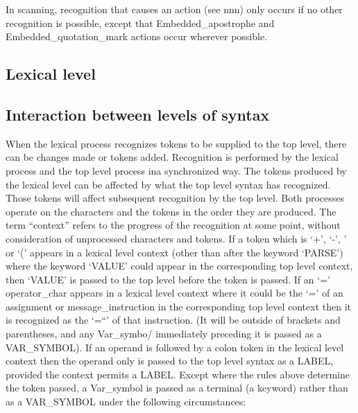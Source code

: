 In scanning, recognition that causes an action (see nnn) only occurs if
no other recognition is possible, except that Embedded\_apostrophe and
Embedded\_quotation\_mark actions occur wherever possible.

\hypertarget{lexical-level}{%
\subsection{Lexical level}\label{lexical-level}}

\hypertarget{interaction-between-levels-of-syntax}{%
\subsection{Interaction between levels of
syntax}\label{interaction-between-levels-of-syntax}}

When the lexical process recognizes tokens to be supplied to the top
level, there can be changes made or tokens added. Recognition is
performed by the lexical process and the top level process ina
synchronized way. The tokens produced by the lexical level can be
affected by what the top level syntax has recognized. Those tokens will
affect subsequent recognition by the top level. Both processes operate
on the characters and the tokens in the order they are produced. The
term ``context'' refers to the progress of the recognition at some
point, without consideration of unprocessed characters and tokens. If a
token which is `+', `-', ' or `(' appears in a lexical level context
(other than after the keyword `PARSE') where the keyword `VALUE' could
appear in the corresponding top level context, then `VALUE' is passed to
the top level before the token is passed. If an `=' operator\_char
appears in a lexical level context where it could be the `=' of an
assignment or message\_instruction in the corresponding top level
context then it is recognized as the `=``' of that instruction. (It will
be outside of brackets and parentheses, and any Var\_symbo/ immediately
preceding it is passed as a VAR\_SYMBOL). If an operand is followed by a
colon token in the lexical level context then the operand only is passed
to the top level syntax as a LABEL, provided the context permits a
LABEL. Except where the rules above determine the token passed, a
Var\_symbol is passed as a terminal (a keyword) rather than as a
VAR\_SYMBOL under the following circumstances:

